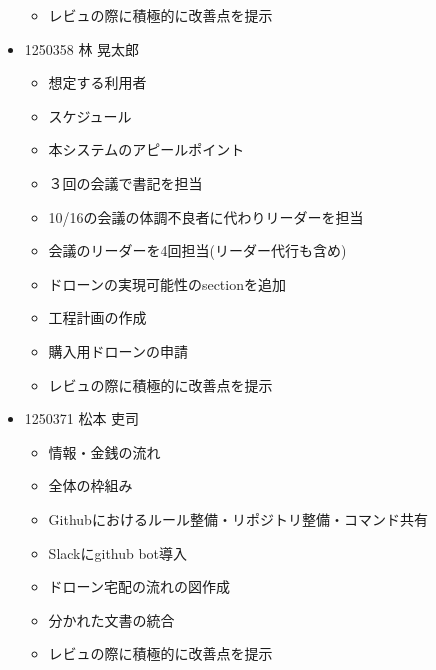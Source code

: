 \documentclass[a4paper, titlepage]{jsarticle}
\begin{document}
\begin{itemize}
\begin{itemize}
          \item レビュの際に積極的に改善点を提示
        \end{itemize}
  \item 1250358 林 晃太郎
        \begin{itemize}
          \item 想定する利用者
          \item スケジュール
          \item 本システムのアピールポイント
          \item ３回の会議で書記を担当
          \item 10/16の会議の体調不良者に代わりリーダーを担当
          \item 会議のリーダーを4回担当(リーダー代行も含め)
          \item ドローンの実現可能性のsectionを追加
          \item 工程計画の作成
          \item 購入用ドローンの申請
          \item レビュの際に積極的に改善点を提示
        \end{itemize}
  \item 1250371 松本 吏司
        \begin{itemize}
          \item 情報・金銭の流れ
          \item 全体の枠組み
          \item Githubにおけるルール整備・リポジトリ整備・コマンド共有
          \item Slackにgithub bot導入
          \item ドローン宅配の流れの図作成
          \item 分かれた文書の統合
          \item レビュの際に積極的に改善点を提示
        \end{itemize}
\end{itemize}
\clearpage


\end{document}
